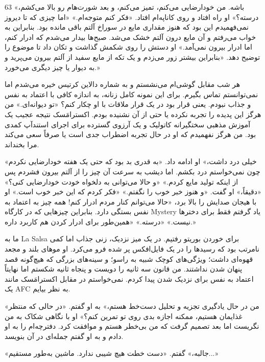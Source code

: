 63
«باشه. من خودارضایی می‌کنم، تمیز می‌کنم، و بعد شورت‌هام رو بالا می‌کشم، درسته؟» او راه افتاد و روی کاناپه‌ام افتاد.
«فکر کنم متوجه‌ام.»
«اما چیزی که تا دیروز نمی‌فهمیدم این بود که هنوز مقداری مایع در سوراخ آلتم باقی مانده بود. بنابراین به خواب می‌رفتم و آن مایع درون آلتم خشک می‌شد. صبح‌ها بیدار می‌شدم که ادرار کنم، اما ادرار بیرون نمی‌آمد.» او دستش را روی شکمش گذاشت و تکان داد تا موضوع را توضیح دهد. «بنابراین بیشتر زور می‌زدم و یک تکه از مایع سفید از آلتم بیرون می‌پرید و به دیوار یا چیز دیگری می‌خورد.»

هر شب مقابل گوشی‌ام می‌نشستم و به شماره دالاین کرتیس خیره می‌شدم اما نمی‌توانستم تماس بگیرم. برای این نمونه کامل زنانه، به اندازه کافی با اعتماد به نفس و جذاب نبودم. یعنی قرار بود در یک قرار ملاقات با او چکار کنم؟ «تو دیوانه‌ای.» من هرگز این پدیده را تجربه نکرده یا حتی از آن نشنیده بودم. اکسترامَسک نتیجه عجیب یک آموزش مذهبی سختگیرانه کاتولیک و یک آرزوی گسترده برای اجرای استندآپ کمدی بود. من هرگز نفهمیدم که او در حال تجربه اضطراب جدی است یا صرفاً سعی می‌کند مرا بخنداند.

«خیلی درد داشت،» او ادامه داد. «به قدری بد بود که حتی یک هفته خودارضایی نکردم چون نمی‌خواستم درد بکشم. اما دیشب به سرعت آن چیز را از آلتم بیرون فشردم پس از اینکه تولید مایع کردم.»
«و حالا می‌توانی به دلخواه خودت خودارضایی کنی؟»
«دقیقاً،» او گفت. «و هنوز خبر خوب را نگفتم.»
«فکر کردم که این خبر خوب است.»
او با هیجان صدایش را بالا برد، «حالا می‌توانم کنار مردم ادرار کنم! همه چیز به اعتماد به نفس بستگی دارد. بنابراین چیزهایی که در کارگاه Mystery یاد گرفتم فقط برای دخترها نیست.»
«درسته.»
«همین‌طور برای ادرار کردن هم کاربرد داره.»

ما به La Salsa برای خوردن بوریتو رفتیم. در یک میز نزدیک، زنی جذاب اما کمی نامرتب بود که رسیدها را در یک فایل‌افکس پر شده فرو می‌کرد. او موهای بلند و مجعد قهوه‌ای داشت؛ ویژگی‌های کوچک شبیه به راسو؛ و سینه‌های بزرگی که هیچ‌گونه قصد پنهان شدن نداشتند. من قانون سه ثانیه را دویست و پنجاه ثانیه شکستم اما نهایتاً اعتماد به نفس برای نزدیک شدن پیدا کردم. نمی‌خواستم در مقابل اکسترامَسک مانند یک AFC به نظر بیایم.

«من در حال یادگیری تجزیه و تحلیل دست‌خط هستم،» به او گفتم. «در حالی که منتظر غذایمان هستیم،‌ ممکنه اجازه بدی روی تو تمرین کنم؟» او با نگاهی شکاک به من نگریست اما بعد تصمیم گرفت که من بی‌خطر هستم و موافقت کرد. دفترچه‌ام را به او دادم و به او گفتم جمله‌ای در آن بنویسد.

«جالبه،» گفتم. «دست خطت هیچ شیبی ندارد. ماشین به‌طور مستقیم...»